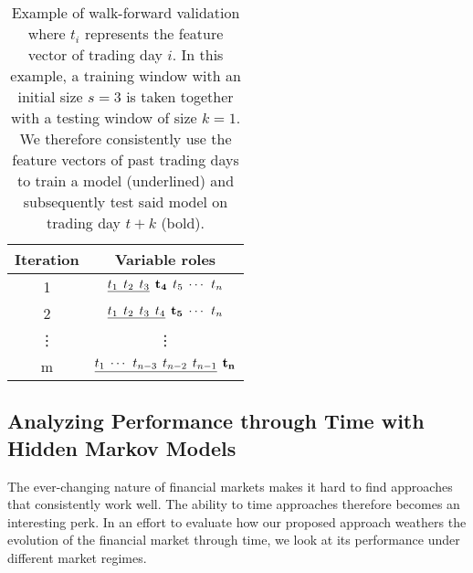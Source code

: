 \documentclass[preprint,1p, times,authoryear]{elsarticle}
\begin{document}
\begin{table}[!ht]
 \caption{Example of walk-forward validation where $t_{i}$ represents the feature vector of trading day $i$. In this example, a training window with an initial size $s=3$ is taken together with a testing window of size $k=1$. We therefore consistently use the feature vectors of past trading days to train a model (underlined) and subsequently test said model on trading day $t+k$ (bold). } 
  \centering
  \begin{tabular}{cc}
    \toprule
    Iteration & Variable roles\\
    \midrule
     1 & $ \underline{t_{1} \hspace{1.5mm} t_{2} \hspace{1.5mm} t_{3}} \hspace{1.5mm} \mathbf{ t_{4} } \hspace{1.5mm} t_{5} \hspace{1.5mm} \dotsi \hspace{1.5mm} t_{n} $ \\
     2 & $ \underline{ t_{1} \hspace{1.5mm} t_{2} \hspace{1.5mm} t_{3} \hspace{1.5mm} t_{4}} \hspace{1.5mm} \mathbf{t_{5}}  \hspace{1.5mm} \dotsi \hspace{1.5mm} t_{n} $ \\
     \vdots & \vdots \\
     m & $ \underline{ t_{1} \hspace{1.5mm} \dotsi \hspace{1.5mm} t_{n-3} \hspace{1.5mm} t_{n-2} \hspace{1.5mm} t_{n-1}} \hspace{1.5mm} \mathbf{t_{n}} $ \\

    \bottomrule
  \end{tabular}
  \label{tab:ev}
\end{table}

\subsection{Analyzing Performance through Time with Hidden Markov Models}
\label{meth:hmm}
The ever-changing nature of financial markets makes it hard to find approaches that consistently work well. The ability to time approaches therefore becomes an interesting perk. In an effort to evaluate how our proposed approach weathers the evolution of the financial market through time, we look at its performance under different market regimes.
\end{document}
